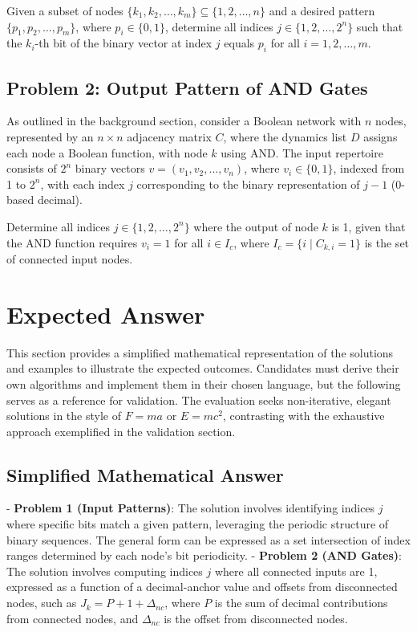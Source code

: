 \documentclass[12pt]{article}
\begin{document}
Given a subset of nodes \( \{k_1, k_2, \dots, k_m\} \subseteq \{1, 2, \dots, n\} \) and a desired pattern \( \{p_1, p_2, \dots, p_m\} \), where \( p_i \in \{0, 1\} \), determine all indices \( j \in \{1, 2, \dots, 2^n\} \) such that the \( k_i \)-th bit of the binary vector at index \( j \) equals \( p_i \) for all \( i = 1, 2, \dots, m \).

\subsection{Problem 2: Output Pattern of AND Gates}
As outlined in the background section, consider a Boolean network with \( n \) nodes, represented by an \( n \times n \) adjacency matrix \( C \), where the dynamics list \( D \) assigns each node a Boolean function, with node \( k \) using AND. The input repertoire consists of \( 2^n \) binary vectors \( v = (v_1, v_2, \dots, v_n) \), where \( v_i \in \{0, 1\} \), indexed from 1 to \( 2^n \), with each index \( j \) corresponding to the binary representation of \( j-1 \) (0-based decimal).

Determine all indices \( j \in \{1, 2, \dots, 2^n\} \) where the output of node \( k \) is 1, given that the AND function requires \( v_i = 1 \) for all \( i \in I_c \), where \( I_c = \{i \mid C_{k,i} = 1\} \) is the set of connected input nodes.

\section{Expected Answer}
This section provides a simplified mathematical representation of the solutions and examples to illustrate the expected outcomes. Candidates must derive their own algorithms and implement them in their chosen language, but the following serves as a reference for validation. The evaluation seeks non-iterative, elegant solutions in the style of \( F = ma \) or \( E = mc^2 \), contrasting with the exhaustive approach exemplified in the validation section.

\subsection{Simplified Mathematical Answer}
- \textbf{Problem 1 (Input Patterns)}: The solution involves identifying indices \( j \) where specific bits match a given pattern, leveraging the periodic structure of binary sequences. The general form can be expressed as a set intersection of index ranges determined by each node’s bit periodicity.
- \textbf{Problem 2 (AND Gates)}: The solution involves computing indices \( j \) where all connected inputs are 1, expressed as a function of a decimal-anchor value and offsets from disconnected nodes, such as \( J_k = P + 1 + \Delta_{nc} \), where \( P \) is the sum of decimal contributions from connected nodes, and \( \Delta_{nc} \) is the offset from disconnected nodes.
\end{document}
